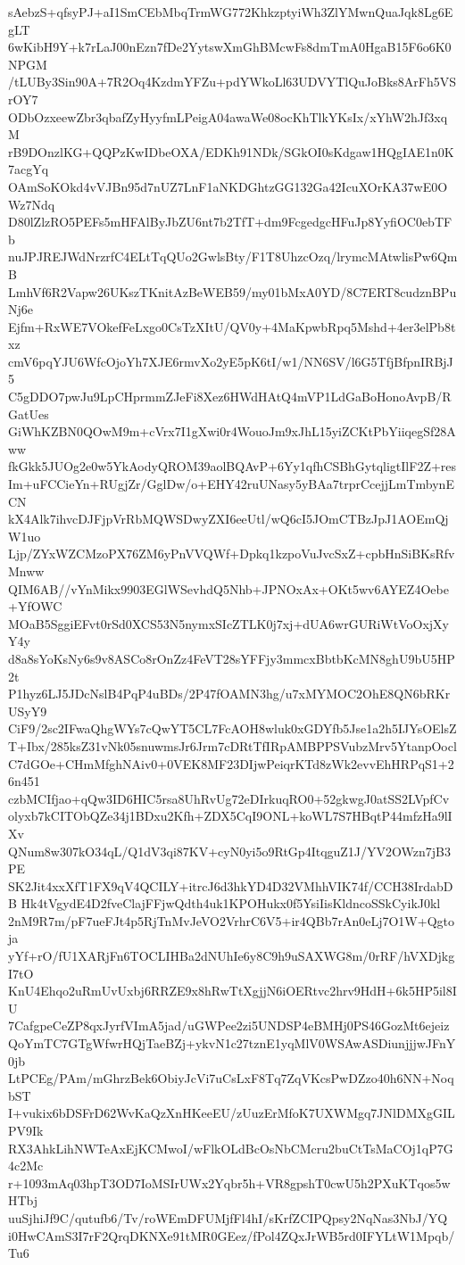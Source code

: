 sAebzS+qfsyPJ+aI1SmCEbMbqTrmWG772KhkzptyiWh3ZlYMwnQuaJqk8Lg6EgLT
6wKibH9Y+k7rLaJ00nEzn7fDe2YytswXmGhBMcwFs8dmTmA0HgaB15F6o6K0NPGM
/tLUBy3Sin90A+7R2Oq4KzdmYFZu+pdYWkoLl63UDVYTlQuJoBks8ArFh5VSrOY7
ODbOzxeewZbr3qbafZyHyyfmLPeigA04awaWe08ocKhTlkYKsIx/xYhW2hJf3xqM
rB9DOnzlKG+QQPzKwIDbeOXA/EDKh91NDk/SGkOI0sKdgaw1HQgIAE1n0K7acgYq
OAmSoKOkd4vVJBn95d7nUZ7LnF1aNKDGhtzGG132Ga42IcuXOrKA37wE0OWz7Ndq
D80lZlzRO5PEFs5mHFAlByJbZU6nt7b2TfT+dm9FcgedgcHFuJp8YyfiOC0ebTFb
nuJPJREJWdNrzrfC4ELtTqQUo2GwlsBty/F1T8UhzcOzq/lrymcMAtwlisPw6QmB
LmhVf6R2Vapw26UKszTKnitAzBeWEB59/my01bMxA0YD/8C7ERT8cudznBPuNj6e
Ejfm+RxWE7VOkefFeLxgo0CsTzXItU/QV0y+4MaKpwbRpq5Mshd+4er3elPb8txz
cmV6pqYJU6WfcOjoYh7XJE6rmvXo2yE5pK6tI/w1/NN6SV/l6G5TfjBfpnIRBjJ5
C5gDDO7pwJu9LpCHprmmZJeFi8Xez6HWdHAtQ4mVP1LdGaBoHonoAvpB/RGatUes
GiWhKZBN0QOwM9m+cVrx7I1gXwi0r4WouoJm9xJhL15yiZCKtPbYiiqegSf28Aww
fkGkk5JUOg2e0w5YkAodyQROM39aolBQAvP+6Yy1qfhCSBhGytqligtIlF2Z+res
Im+uFCCieYn+RUgjZr/GglDw/o+EHY42ruUNasy5yBAa7trprCcejjLmTmbynECN
kX4Alk7ihvcDJFjpVrRbMQWSDwyZXI6eeUtl/wQ6cI5JOmCTBzJpJ1AOEmQjW1uo
Ljp/ZYxWZCMzoPX76ZM6yPnVVQWf+Dpkq1kzpoVuJvcSxZ+cpbHnSiBKsRfvMnww
QIM6AB//vYnMikx9903EGlWSevhdQ5Nhb+JPNOxAx+OKt5wv6AYEZ4Oebe+YfOWC
MOaB5SggiEFvt0rSd0XCS53N5nymxSIcZTLK0j7xj+dUA6wrGURiWtVoOxjXyY4y
d8a8sYoKsNy6s9v8ASCo8rOnZz4FeVT28sYFFjy3mmcxBbtbKcMN8ghU9bU5HP2t
P1hyz6LJ5JDcNslB4PqP4uBDs/2P47fOAMN3hg/u7xMYMOC2OhE8QN6bRKrUSyY9
CiF9/2sc2IFwaQhgWYs7cQwYT5CL7FcAOH8wluk0xGDYfb5Jse1a2h5IJYsOElsZ
T+Ibx/285ksZ31vNk05snuwmsJr6Jrm7cDRtTfIRpAMBPPSVubzMrv5YtanpOocl
C7dGOe+CHmMfghNAiv0+0VEK8MF23DIjwPeiqrKTd8zWk2evvEhHRPqS1+26n451
czbMCIfjao+qQw3ID6HIC5rsa8UhRvUg72eDIrkuqRO0+52gkwgJ0atSS2LVpfCv
olyxb7kCITObQZe34j1BDxu2Kfh+ZDX5CqI9ONL+koWL7S7HBqtP44mfzHa9lIXv
QNum8w307kO34qL/Q1dV3qi87KV+cyN0yi5o9RtGp4ItqguZ1J/YV2OWzn7jB3PE
SK2Jit4xxXfT1FX9qV4QCILY+itrcJ6d3hkYD4D32VMhhVIK74f/CCH38IrdabDB
Hk4tVgydE4D2fveClajFFjwQdth4uk1KPOHukx0f5YsiIisKldncoSSkCyikJ0kl
2nM9R7m/pF7ueFJt4p5RjTnMvJeVO2VrhrC6V5+ir4QBb7rAn0eLj7O1W+Qgtoja
yYf+rO/fU1XARjFn6TOCLIHBa2dNUhIe6y8C9h9uSAXWG8m/0rRF/hVXDjkgI7tO
KnU4Ehqo2uRmUvUxbj6RRZE9x8hRwTtXgjjN6iOERtvc2hrv9HdH+6k5HP5il8IU
7CafgpeCeZP8qxJyrfVImA5jad/uGWPee2zi5UNDSP4eBMHj0PS46GozMt6ejeiz
QoYmTC7GTgWfwrHQjTaeBZj+ykvN1c27tznE1yqMlV0WSAwASDiunjjjwJFnY0jb
LtPCEg/PAm/mGhrzBek6ObiyJcVi7uCsLxF8Tq7ZqVKcsPwDZzo40h6NN+NoqbST
I+vukix6bDSFrD62WvKaQzXnHKeeEU/zUuzErMfoK7UXWMgq7JNlDMXgGILPV9Ik
RX3AhkLihNWTeAxEjKCMwoI/wFlkOLdBcOsNbCMcru2buCtTsMaCOj1qP7G4c2Mc
r+1093mAq03hpT3OD7IoMSIrUWx2Yqbr5h+VR8gpshT0cwU5h2PXuKTqos5wHTbj
uuSjhiJf9C/qutufb6/Tv/roWEmDFUMjfFl4hI/sKrfZCIPQpsy2NqNas3NbJ/YQ
i0HwCAmS3I7rF2QrqDKNXe91tMR0GEez/fPol4ZQxJrWB5rd0IFYLtW1Mpqb/Tu6
